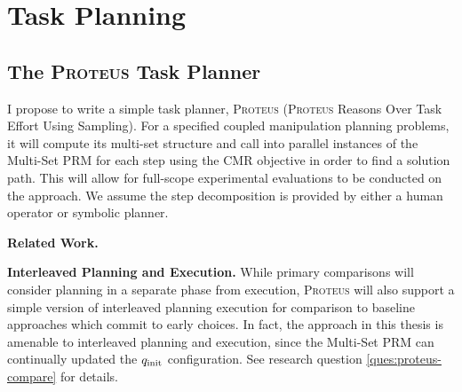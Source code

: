 \section{Task Planning}
\label{chap:task-planning}

\subsection{The \textsc{Proteus} Task Planner}

I propose to write a simple task planner,
\textsc{Proteus}
(\textsc{Proteus} Reasons Over Task Effort Using Sampling).
For a specified coupled manipulation planning problems,
it will compute its multi-set structure
and call into parallel instances of the Multi-Set PRM for each step
using the CMR objective
in order to find a solution path.
This will allow for full-scope experimental evaluations to be conducted
on the approach.
We assume the step decomposition is provided by either
a human operator or symbolic planner.

\textbf{Related Work.}

\textbf{Interleaved Planning and Execution.}
While primary comparisons
will consider planning in a separate phase from execution,
\textsc{Proteus} will also support a simple version of
interleaved planning execution
for comparison to baseline approaches which commit to early choices.
In fact, the approach in this thesis is
amenable to interleaved planning and execution,
since the Multi-Set PRM can continually updated
the $q_{\mbox{\scriptsize init}}$ configuration.
See research question \ref{ques:proteus-compare} for details.
